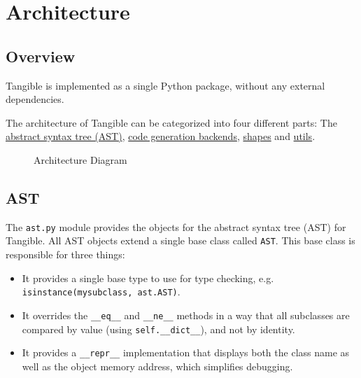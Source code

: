 
\chapter{Architecture}

\label{ch:architecture}


\section{Overview}\label{sec:overview}

Tangible is implemented as a single Python package, without any external
dependencies.

The architecture of Tangible can be categorized into four different parts: The
\hyperref[sec:ast]{abstract syntax tree (AST)}, \hyperref[sec:backends]{code
generation backends}, \hyperref[sec:shapes]{shapes} and
\hyperref[sec:utils]{utils}.

\vspace{7mm}

\begin{figure}[h]
	\centering
	
	\caption{Architecture Diagram}
	\label{img:architecture}
\end{figure}


\section{AST}\label{sec:ast}

The \texttt{ast.py} module provides the objects for the abstract syntax tree
(AST) for Tangible. All AST objects extend a single base class called
\texttt{AST}. This base class is responsible for three things:

\begin{itemize}
	\item It provides a single base type to use for type checking, e.g.
		\texttt{isinstance(mysubclass, ast.AST)}.
	\item It overrides the \texttt{\_\_eq\_\_} and \texttt{\_\_ne\_\_} methods in
		a way that all subclasses are compared by value (using
		\texttt{self.\_\_dict\_\_}), and not by identity.
	\item It provides a \texttt{\_\_repr\_\_} implementation that displays both
		the class name as well as the object memory address, which simplifies
		debugging.
\end{itemize}

